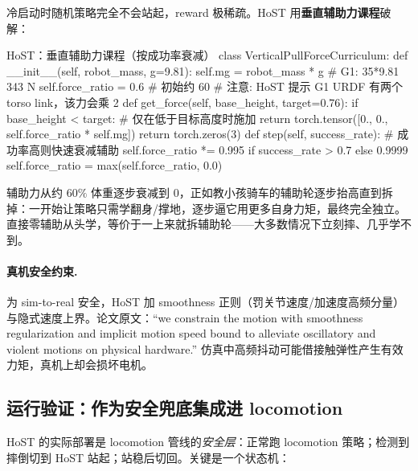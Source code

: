 冷启动时随机策略完全不会站起，reward 极稀疏。HoST 用\textbf{垂直辅助力课程}破解：

\begin{codebox}[Python]{HoST：垂直辅助力课程（按成功率衰减）}
class VerticalPullForceCurriculum:
    def __init__(self, robot_mass, g=9.81):
        self.mg = robot_mass * g           # G1: 35*9.81 ~ 343 N
        self.force_ratio = 0.6             # 初始约 60%
        # 注意: HoST 提示 G1 URDF 有两个 torso link，该力会乘 2
    def get_force(self, base_height, target=0.76):
        if base_height < target:           # 仅在低于目标高度时施加
            return torch.tensor([0., 0., self.force_ratio * self.mg])
        return torch.zeros(3)
    def step(self, success_rate):          # 成功率高则快速衰减辅助
        self.force_ratio *= 0.995 if success_rate > 0.7 else 0.9999
        self.force_ratio = max(self.force_ratio, 0.0)
\end{codebox}

\begin{insight}[辅助力课程像自行车辅助轮]\label{ins:rlmc-hl-aux}
辅助力从约 $60\%$ 体重逐步衰减到 $0$，正如教小孩骑车的辅助轮逐步抬高直到拆掉：一开始让策略只需学翻身/撑地，逐步逼它用更多自身力矩，最终完全独立。直接零辅助从头学，等价于一上来就拆辅助轮——大多数情况下立刻摔、几乎学不到。
\end{insight}

\paragraph{真机安全约束.}
为 sim-to-real 安全，HoST 加 smoothness 正则（罚关节速度/加速度高频分量）与隐式速度上界。论文原文：“we constrain the motion with smoothness regularization and implicit motion speed bound to alleviate oscillatory and violent motions on physical hardware.” 仿真中高频抖动可能借接触弹性产生有效力矩，真机上却会损坏电机。

\subsection{运行验证：作为安全兜底集成进 locomotion}
HoST 的实际部署是 locomotion 管线的\emph{安全层}：正常跑 locomotion 策略；检测到摔倒切到 HoST 站起；站稳后切回。关键是一个状态机：

